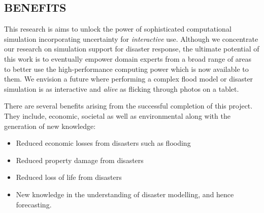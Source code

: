 \subsection*{BENEFITS}

This research is aims to unlock the power of sophisticated
computational simulation incorporating uncertainty for
\emph{interactive} use.  Although we concentrate our research on
simulation support for disaster response, the ultimate potential of
this work is to eventually empower domain experts from a broad range
of areas to better use the high-performance computing power which is
now available to them. We envision a future where performing a complex
flood model or disaster simulation is as interactive and \emph{alive}
as flicking through photos on a tablet.

There are several benefits arising from the successful completion of
this project. They include, economic, societal as well as
environmental along with the generation of new knowledge:
\begin{itemize}
\item Reduced economic losses from disasters such as flooding
\item Reduced property damage from disasters
\item Reduced loss of life from disasters
\item New knowledge in the understanding of disaster modelling, and
  hence forecasting.
\end{itemize}
